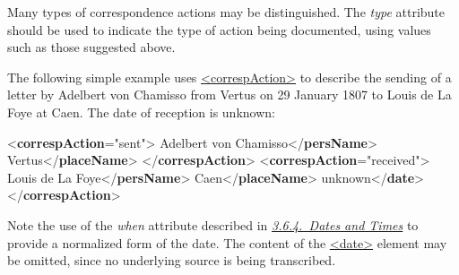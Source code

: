 Many types of correspondence actions may be distinguished. The {\itshape type} attribute should be used to indicate the type of action being documented, using values such as those suggested above.\par
The following simple example uses \hyperref[TEI.correspAction]{<correspAction>} to describe the sending of a letter by Adelbert von Chamisso from Vertus on 29 January 1807 to Louis de La Foye at Caen. The date of reception is unknown: \par\bgroup{}\exampleFont \begin{shaded}\noindent\mbox{}{<\textbf{correspAction}\hspace*{1em}{type}="{sent}">}\mbox{}\newline 
{}Adelbert von Chamisso{</\textbf{persName}>}\mbox{}\newline 
{}Vertus{</\textbf{placeName}>}\mbox{}\newline 
{}\mbox{}\newline 
{</\textbf{correspAction}>}\mbox{}\newline 
{<\textbf{correspAction}\hspace*{1em}{type}="{received}">}\mbox{}\newline 
{}Louis de La Foye{</\textbf{persName}>}\mbox{}\newline 
{}Caen{</\textbf{placeName}>}\mbox{}\newline 
{}unknown{</\textbf{date}>}\mbox{}\newline 
{</\textbf{correspAction}>}\end{shaded}\egroup\par \noindent  Note the use of the {\itshape when} attribute described in \textit{\hyperref[CONADA]{3.6.4.\ Dates and Times}} to provide a normalized form of the date. The content of the \hyperref[TEI.date]{<date>} element may be omitted, since no underlying source is being transcribed.\par
